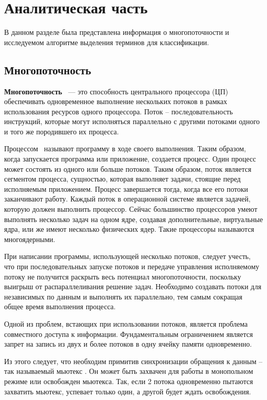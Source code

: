 \chapter{Аналитическая часть}
В данном разделе была представлена информация о многопоточности и исследуемом алгоритме выделения терминов для классификации.

\section{Многопоточность}

\textbf{Многопоточность}~\cite{multithreading}  --- это способность центрального процессора (ЦП) обеспечивать одновременное выполнение нескольких потоков в рамках использования ресурсов одного процессора. Поток -- последовательность инструкций, которые могут исполняться параллельно с другими потоками одного и того же породившего их процесса.

Процессом~\cite{process} называют программу в ходе своего выполнения. Таким образом, когда запускается программа или приложение, создается процесс. Один процесс может состоять из одного или больше потоков.
Таким образом, поток является сегментом процесса, сущностью, которая выполняет задачи, стоящие перед исполняемым приложением. 
Процесс завершается тогда, когда все его потоки заканчивают работу.
Каждый поток в операционной системе является задачей, которую должен выполнить процессор. Сейчас большинство процессоров умеют выполнять несколько задач на одном ядре, создавая дополнительные, виртуальные ядра, или же имеют несколько физических ядер. Такие процессоры называются многоядерными. 

При написании программы, использующей несколько потоков, следует учесть, что при последовательных запуске потоков и передаче управления исполняемому потоку не получится раскрыть весь потенциал многопоточности, поскольку выигрыш от распараллеливания решение задач.
Необходимо создавать потоки для независимых по данным и выполнять их параллельно, тем самым сокращая общее время выполнения процесса.

Одной из проблем, встающих при использовании потоков, является проблема совместного доступа к информации. Фундаментальным ограничением является запрет на запись из двух и более потоков в одну ячейку памяти одновременно.

Из этого следует, что необходим примитив синхронизации обращения к данным -- так называемый мьютекс . 
Он может быть захвачен для работы в монопольном режиме или освобожден мьютекса. 
Так, если 2 потока одновременно пытаются захватить мьютекс, успевает только один, а другой будет ждать освобождения. 

